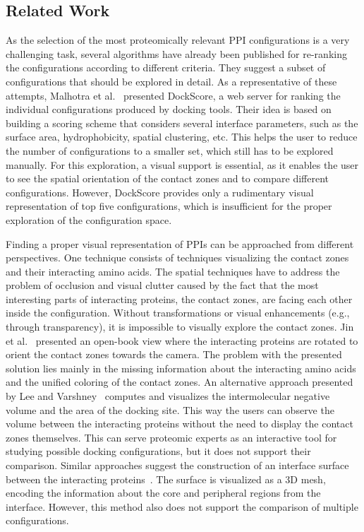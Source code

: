 \documentclass{bmcart}
\begin{document}
\subsection*{Related Work}
As the selection of the most proteomically relevant PPI configurations is a very challenging task, several algorithms have already been published for re-ranking the configurations according to different criteria.
They suggest a subset of configurations that should be explored in detail.
As a representative of these attempts, Malhotra et al.~\cite{Malhotra2015} presented DockScore, a web server for ranking the individual configurations produced by docking tools. 
Their idea is based on building a scoring scheme that considers several interface parameters, such as the surface area, hydrophobicity, spatial clustering, etc.
This helps the user to reduce the number of configurations to a smaller set, which still has to be explored manually.
For this exploration, a visual support is essential, as it enables the user to see the spatial orientation of the contact zones and to compare different configurations.
However, DockScore provides only a rudimentary visual representation of top five configurations, which is insufficient for the proper exploration of the configuration space.
 
Finding a proper visual representation of PPIs can be approached from different perspectives. 
One technique consists of techniques visualizing the contact zones and their interacting amino acids.
The spatial techniques have to address the problem of occlusion and visual clutter caused by the fact that the most interesting parts of interacting proteins, the contact zones, are facing each other inside the configuration.
Without transformations or visual enhancements (e.g., through transparency), it is impossible to visually explore the contact zones.
Jin et al.~\cite{Jin2014} presented an open-book view where the interacting proteins are rotated to orient the contact zones towards the camera.
The problem with the presented solution lies mainly in the missing information about the interacting amino acids and the unified coloring of the contact zones.
An alternative approach presented by Lee and Varshney~\cite{Varshney2003} computes and visualizes the intermolecular negative volume and the area of the docking site. %
This way the users can observe the volume between the interacting proteins without the need to display the contact zones themselves.
This can serve proteomic experts as an interactive tool for studying possible docking configurations, but it does not support their comparison.
Similar approaches suggest the construction of an interface surface between the interacting proteins~\cite{480793, Ban2006}.
The surface is visualized as a 3D mesh, encoding the information about the core and peripheral regions from the interface. 
However, this method also does not support the comparison of multiple configurations.
\end{document}
